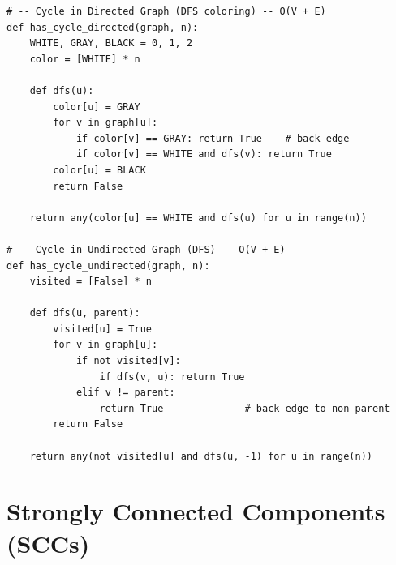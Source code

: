 \documentclass[11pt,a4paper]{report}
\begin{document}
\begin{lstlisting}
# -- Cycle in Directed Graph (DFS coloring) -- O(V + E)
def has_cycle_directed(graph, n):
    WHITE, GRAY, BLACK = 0, 1, 2
    color = [WHITE] * n

    def dfs(u):
        color[u] = GRAY
        for v in graph[u]:
            if color[v] == GRAY: return True    # back edge
            if color[v] == WHITE and dfs(v): return True
        color[u] = BLACK
        return False

    return any(color[u] == WHITE and dfs(u) for u in range(n))

# -- Cycle in Undirected Graph (DFS) -- O(V + E)
def has_cycle_undirected(graph, n):
    visited = [False] * n

    def dfs(u, parent):
        visited[u] = True
        for v in graph[u]:
            if not visited[v]:
                if dfs(v, u): return True
            elif v != parent:
                return True              # back edge to non-parent
        return False

    return any(not visited[u] and dfs(u, -1) for u in range(n))
\end{lstlisting}

\section{Strongly Connected Components (SCCs)}
\end{document}

